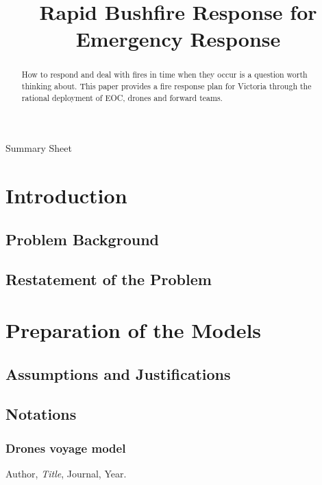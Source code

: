 \documentclass[a4paper,12pt]{article}
\title{\vspace{-2cm}Rapid Bushfire Response for Emergency Response}
\date{}
\begin{document}
\maketitle
\vspace{-2cm}
\begin{center}
    \large Summary Sheet
\end{center}

\begin{abstract}
\noindent How to respond and deal with fires in time when they occur is a question worth thinking about. This paper provides a fire response plan for Victoria through the rational deployment of EOC, drones and forward teams.\\
\end{abstract}

\tableofcontents
\newpage

\section{Introduction}
\subsection{Problem Background}

\subsection{Restatement of the Problem}

\section{Preparation of the Models}
\subsection{Assumptions and Justifications}

\subsection{Notations}

\subsubsection{Drones voyage model}


\begin{thebibliography}{99}
 Author, \emph{Title}, Journal, Year.
\end{thebibliography}
\end{document}
